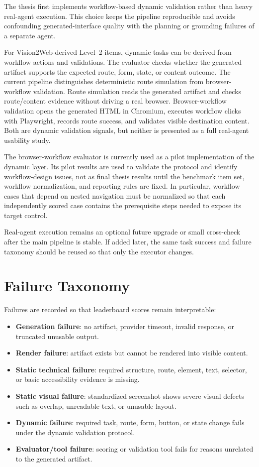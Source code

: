 The thesis first implements workflow-based dynamic validation rather than heavy
real-agent execution. This choice keeps the pipeline reproducible and avoids
confounding generated-interface quality with the planning or grounding failures
of a separate agent.

For Vision2Web-derived Level~2 items, dynamic tasks can be derived from
workflow actions and validations. The evaluator checks whether the generated
artifact supports the expected route, form, state, or content outcome. The
current pipeline distinguishes deterministic route simulation from
browser-workflow validation. Route simulation reads the generated artifact and
checks route/content evidence without driving a real browser. Browser-workflow
validation opens the generated HTML in Chromium, executes workflow clicks with
Playwright, records route success, and validates visible destination content.
Both are dynamic validation signals, but neither is presented as a full
real-agent usability study.

The browser-workflow evaluator is currently used as a pilot implementation of
the dynamic layer. Its pilot results are used to validate the protocol and
identify workflow-design issues, not as final thesis results until the benchmark
item set, workflow normalization, and reporting rules are fixed. In particular,
workflow cases that depend on nested navigation must be normalized so that each
independently scored case contains the prerequisite steps needed to expose its
target control.

Real-agent execution remains an optional future upgrade or small cross-check
after the main pipeline is stable. If added later, the same task success and
failure taxonomy should be reused so that only the executor changes.

\section{Failure Taxonomy}
\label{sec:failure-taxonomy}

Failures are recorded so that leaderboard scores remain interpretable:

\begin{itemize}
  \item \textbf{Generation failure}: no artifact, provider timeout, invalid
  response, or truncated unusable output.
  \item \textbf{Render failure}: artifact exists but cannot be rendered into
  visible content.
  \item \textbf{Static technical failure}: required structure, route, element,
  text, selector, or basic accessibility evidence is missing.
  \item \textbf{Static visual failure}: standardized screenshot shows severe
  visual defects such as overlap, unreadable text, or unusable layout.
  \item \textbf{Dynamic failure}: required task, route, form, button, or state
  change fails under the dynamic validation protocol.
  \item \textbf{Evaluator/tool failure}: scoring or validation tool fails for
  reasons unrelated to the generated artifact.
\end{itemize}

